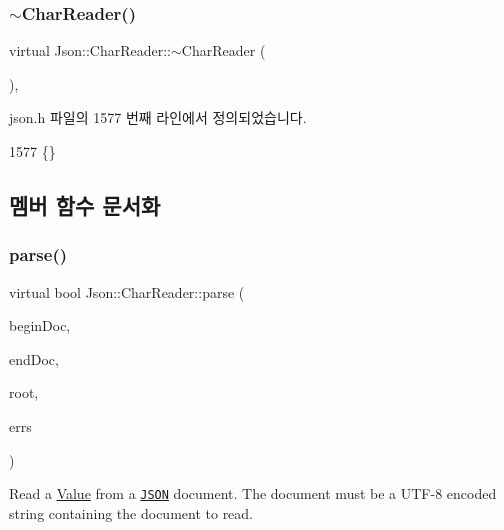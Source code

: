 \subsubsection{\texorpdfstring{$\sim$\+Char\+Reader()}{~CharReader()}}
{\footnotesize\ttfamily virtual Json\+::\+Char\+Reader\+::$\sim$\+Char\+Reader (\begin{DoxyParamCaption}{ }\end{DoxyParamCaption})\hspace{0.3cm}{\ttfamily [inline]}, {\ttfamily [virtual]}}



json.\+h 파일의 1577 번째 라인에서 정의되었습니다.


\begin{DoxyCode}
1577 \{\}
\end{DoxyCode}


\subsection{멤버 함수 문서화}
\mbox{\label{class_json_1_1_char_reader_a7983680d50fd0745f371c43b162e78e1}} 
\subsubsection{\texorpdfstring{parse()}{parse()}}
{\footnotesize\ttfamily virtual bool Json\+::\+Char\+Reader\+::parse (\begin{DoxyParamCaption}\item[{char const $\ast$}]{begin\+Doc,  }\item[{char const $\ast$}]{end\+Doc,  }\item[{\hyperlink{class_json_1_1_value}{Value} $\ast$}]{root,  }\item[{\hyperlink{json_8h_a1e723f95759de062585bc4a8fd3fa4be}{J\+S\+O\+N\+C\+P\+P\+\_\+\+S\+T\+R\+I\+NG} $\ast$}]{errs }\end{DoxyParamCaption})\hspace{0.3cm}{\ttfamily [pure virtual]}}



Read a \hyperlink{class_json_1_1_value}{Value} from a \href{http://www.json.org}{\tt J\+S\+ON} document. The document must be a U\+T\+F-\/8 encoded string containing the document to read. 


